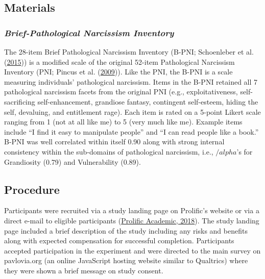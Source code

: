 \documentclass[
  donotrepeattitle,doc, 12pt, a4paper,floatsintext]{apa7}
\begin{document}
\hypertarget{materials-1}{%
\subsection{Materials}\label{materials-1}}

\hypertarget{brief-pathological-narcissism-inventory}{%
\subsubsection{\texorpdfstring{\emph{Brief-Pathological Narcissism Inventory}}{Brief-Pathological Narcissism Inventory}}\label{brief-pathological-narcissism-inventory}}

The 28-item Brief Pathological Narcissism Inventory (B-PNI; Schoenleber et al. (\protect\hyperlink{ref-schoenleber2015}{2015})) is a modified scale of the original 52-item Pathological Narcissism Inventory (PNI; Pincus et al. (\protect\hyperlink{ref-pincus2009}{2009})). Like the PNI, the B-PNI is a scale measuring individuals' pathological narcissism. Items in the B-PNI retained all 7 pathological narcissism facets from the original PNI (e.g., exploitativeness, self-sacrificing self-enhancement, grandiose fantasy, contingent self-esteem, hiding the self, devaluing, and entitlement rage). Each item is rated on a 5-point Likert scale ranging from 1 (not at all like me) to 5 (very much like me). Example items include ``I find it easy to manipulate people'' and ``I can read people like a book.'' B-PNI was well correlated within itself 0.90 along with strong internal consistency within the sub-domains of pathological narcissism, i.e., \(/alpha\)'s for Grandiosity (0.79) and Vulnerability (0.89).

\hypertarget{procedure-1}{%
\subsection{Procedure}\label{procedure-1}}

Participants were recruited via a study landing page on Prolific's website or via a direct e-mail to eligible participants (\protect\hyperlink{ref-prolificacademic2018}{Prolific Academic, 2018}). The study landing page included a brief description of the study including any risks and benefits along with expected compensation for successful completion. Participants accepted participation in the experiment and were directed to the main survey on pavlovia.org (an online JavaScript hosting website similar to Qualtrics) where they were shown a brief message on study consent.
\end{document}
